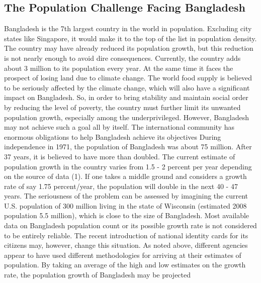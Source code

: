 \documentclass[a4paper,12pt]{article}
\begin{document}
\subsection{The Population Challenge Facing Bangladesh}
Bangladesh is the 7th largest country in the world in population. Excluding city states like Singapore, it would make it to the top of the list in population density. The country may have already reduced its population growth, but this reduction is not nearly enough to avoid dire consequences. Currently, the country adds about 3 million to its population every year. At the same time it faces the prospect of losing land due to climate change. The world food supply is believed to be seriously affected by the climate change, which will also have a significant impact on Bangladesh. So, in order to bring stability and maintain social order by reducing the level of poverty, the country must further limit its unwanted population growth, especially among the underprivileged. However, Bangladesh may not achieve such a goal all by itself. The international community has enormous obligations to help Bangladesh achieve its objectives
\newline
During independence in 1971, the population of Bangladesh was about 75 million. After 37 years, it is believed to have more than doubled. The current estimate of population growth in the country varies from 1.5 - 2 percent per year depending on the source of data (1). If one takes a middle ground and considers a growth rate of say 1.75 percent/year, the population will double in the next 40 -  47 years. The seriousness of the problem can be assessed by imagining the current U.S. population of 300 million living in the state of Wisconsin (estimated 2008 population 5.5 million), which is close to the size of Bangladesh.   Most available data on Bangladesh population count or its possible growth rate is not considered to be entirely reliable. The recent introduction of national identity cards for its citizens may, however, change this situation. As noted above, different agencies appear to have used different methodologies for arriving at their estimates of population. By taking an average of the high and low estimates on the growth rate, the population growth of Bangladesh may be projected
\newline
\end{document}
